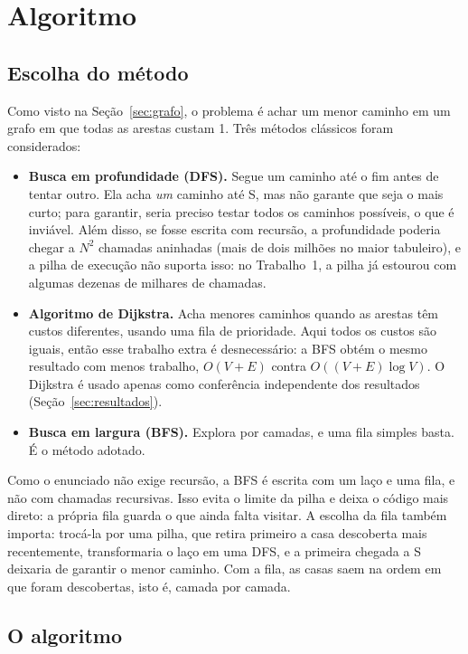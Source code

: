 \section{Algoritmo}
\label{sec:algoritmo}

\subsection{Escolha do método}
\label{sec:metodo}

Como visto na Seção~\ref{sec:grafo}, o problema é achar um menor caminho em um grafo em que
todas as arestas custam 1. Três métodos clássicos foram considerados:

\begin{itemize}
  \item \textbf{Busca em profundidade (DFS).} Segue um caminho até o fim antes de tentar
    outro. Ela acha \emph{um} caminho até S, mas não garante que seja o mais curto; para
    garantir, seria preciso testar todos os caminhos possíveis, o que é inviável. Além disso, se
    fosse escrita com recursão, a profundidade poderia chegar a $N^2$ chamadas aninhadas (mais
    de dois milhões no maior tabuleiro), e a pilha de execução não suporta isso: no
    Trabalho~1, a pilha já estourou com algumas dezenas de milhares de chamadas.
  \item \textbf{Algoritmo de Dijkstra.} Acha menores caminhos quando as arestas têm custos
    diferentes, usando uma fila de prioridade. Aqui todos os custos são iguais, então esse
    trabalho extra é desnecessário: a BFS obtém o mesmo resultado com menos trabalho,
    $O(V + E)$ contra $O((V + E) \log V)$. O Dijkstra é usado apenas como
    conferência independente dos resultados (Seção~\ref{sec:resultados}).
  \item \textbf{Busca em largura (BFS).} Explora por camadas, e uma fila simples basta. É o
    método adotado.
\end{itemize}

Como o enunciado não exige recursão, a BFS é escrita com um laço e uma fila, e não com
chamadas recursivas. Isso evita o limite da pilha e deixa o código mais direto: a própria fila
guarda o que ainda falta visitar. A escolha da fila também importa: trocá-la por uma pilha, que
retira primeiro a casa descoberta mais recentemente, transformaria o laço em uma DFS, e a
primeira chegada a S deixaria de garantir o menor caminho. Com a fila, as casas saem na ordem
em que foram descobertas, isto é, camada por camada.

\subsection{O algoritmo}
\label{sec:pseudocodigo}

